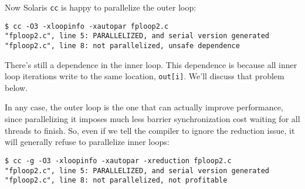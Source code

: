 Now Solaris {\tt cc} is happy to parallelize the outer loop:

{\small 
\begin{verbatim}
$ cc -O3 -xloopinfo -xautopar fploop2.c 
"fploop2.c", line 5: PARALLELIZED, and serial version generated
"fploop2.c", line 8: not parallelized, unsafe dependence
\end{verbatim} 
}

There's still a dependence in the inner loop. This dependence is because
all inner loop iterations write to the same location, {\tt out[i]}. We'll
discuss that problem below.

In any case, the outer loop is the one that can actually improve performance,
since parallelizing it imposes much less barrier synchronization cost 
waiting for all threads to finish. So, even if we tell the compiler to ignore
the reduction issue, it will generally refuse to parallelize inner loops:
{\small 
\begin{verbatim}
$ cc -g -O3 -xloopinfo -xautopar -xreduction fploop2.c 
"fploop2.c", line 5: PARALLELIZED, and serial version generated
"fploop2.c", line 8: not parallelized, not profitable
\end{verbatim} 
}








